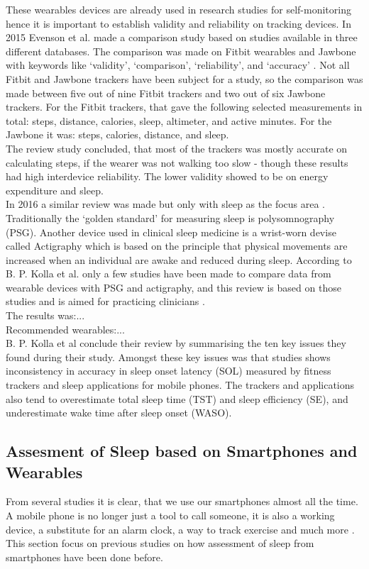 \documentclass[12pt]{article} %
\begin{document}
These wearables devices are already used in research studies for self-monitoring \cite{systematic} hence it is important to establish validity and reliability on tracking devices. In 2015 Evenson et al. made a comparison study based on studies available in three different databases. The comparison was made on Fitbit wearables and Jawbone with keywords like `validity', `comparison', `reliability', and `accuracy' \cite{systematic}. Not all Fitbit and Jawbone trackers have been subject for a study, so the comparison was made between five out of nine Fitbit trackers and two out of six Jawbone trackers. For the Fitbit trackers, that gave the following selected measurements in total: steps, distance, calories, sleep, altimeter, and active minutes. For the Jawbone it was: steps, calories, distance, and sleep. \\

The review study concluded, that most of the trackers was mostly accurate on calculating steps, if the wearer was not walking too slow - though these results had high interdevice reliability. The lower validity showed to be on energy expenditure and sleep.\\

In 2016 a similar review was made but only with sleep as the focus area \cite{consumer}. Traditionally the `golden standard' for measuring sleep is polysomnography (PSG). Another device used in clinical sleep medicine is a wrist-worn devise called Actigraphy which is based on the principle that physical movements are increased when an individual are awake and reduced during sleep. According to B. P. Kolla et al. only a few studies have been made to compare data from wearable devices with PSG and actigraphy, and this review is based on those studies and is aimed for practicing clinicians \cite{consumer}. \\

The results was:... \\
Recommended wearables:...\\

B. P. Kolla et al conclude their review by summarising the ten key issues they found during their study. Amongst these key issues was that studies shows inconsistency in accuracy in sleep onset latency (SOL) measured by fitness trackers and sleep applications for mobile phones. The trackers and applications also tend to overestimate total sleep time (TST) and sleep efficiency (SE), and underestimate wake time after sleep onset (WASO).

\newpage
\subsection{Assesment of Sleep based on Smartphones and Wearables}
From several studies it is clear, that we use our smartphones almost all the time. A mobile phone is no longer just a tool to call someone, it is also a working device, a substitute for an alarm clock, a way to track exercise and much more \cite{dey-wac-ubicomp}. This section focus on previous studies on how assessment of sleep from smartphones have been done before. \\
\end{document}

